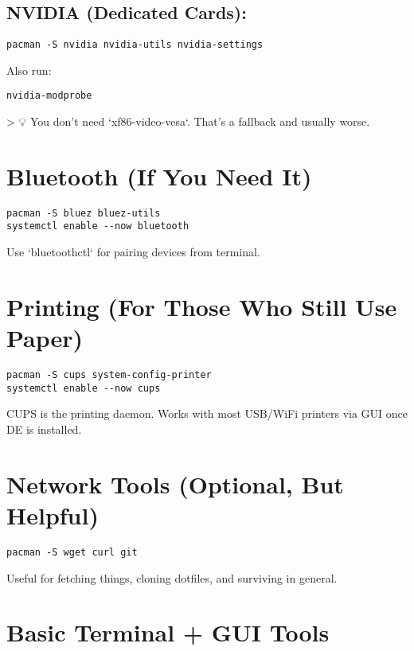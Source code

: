 \documentclass[12pt]{book}
\begin{document}
\subsection*{NVIDIA (Dedicated Cards):}

\begin{lstlisting}
pacman -S nvidia nvidia-utils nvidia-settings
\end{lstlisting}

Also run:

\begin{lstlisting}
nvidia-modprobe
\end{lstlisting}

> 💡 You don’t need `xf86-video-vesa`. That’s a fallback and usually worse.

\section{Bluetooth (If You Need It)}

\begin{lstlisting}
pacman -S bluez bluez-utils
systemctl enable --now bluetooth
\end{lstlisting}

Use `bluetoothctl` for pairing devices from terminal.

\section{Printing (For Those Who Still Use Paper)}

\begin{lstlisting}
pacman -S cups system-config-printer
systemctl enable --now cups
\end{lstlisting}

CUPS is the printing daemon. Works with most USB/WiFi printers via GUI once DE is installed.

\section{Network Tools (Optional, But Helpful)}

\begin{lstlisting}
pacman -S wget curl git
\end{lstlisting}

Useful for fetching things, cloning dotfiles, and surviving in general.

\section{Basic Terminal + GUI Tools}
\end{document}
